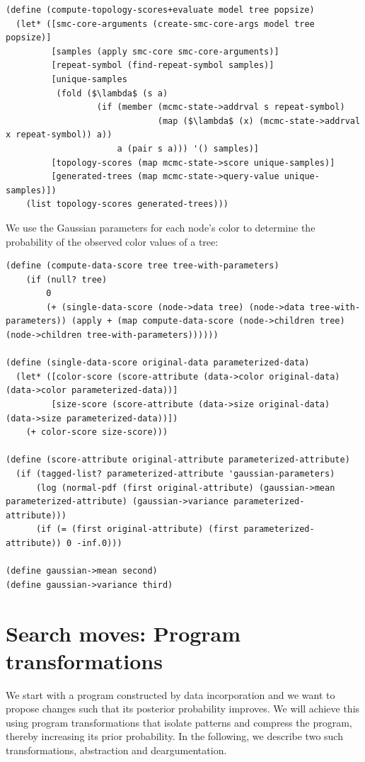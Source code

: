 \documentclass[a4paper,10pt]{article}
\begin{document}
\begin{lstlisting}[frame=trbl]
(define (compute-topology-scores+evaluate model tree popsize)
  (let* ([smc-core-arguments (create-smc-core-args model tree popsize)]
         [samples (apply smc-core smc-core-arguments)]
         [repeat-symbol (find-repeat-symbol samples)]
         [unique-samples
          (fold ($\lambda$ (s a)
                  (if (member (mcmc-state->addrval s repeat-symbol)
                              (map ($\lambda$ (x) (mcmc-state->addrval x repeat-symbol)) a))
                      a (pair s a))) '() samples)]
         [topology-scores (map mcmc-state->score unique-samples)]
         [generated-trees (map mcmc-state->query-value unique-samples)])
    (list topology-scores generated-trees)))
\end{lstlisting}
We use the Gaussian parameters for each node's color to determine the probability of the observed color values of a tree:
\begin{lstlisting}[frame=trbl]
(define (compute-data-score tree tree-with-parameters)
    (if (null? tree)
        0
        (+ (single-data-score (node->data tree) (node->data tree-with-parameters)) (apply + (map compute-data-score (node->children tree) (node->children tree-with-parameters))))))

(define (single-data-score original-data parameterized-data)
  (let* ([color-score (score-attribute (data->color original-data) (data->color parameterized-data))]
         [size-score (score-attribute (data->size original-data) (data->size parameterized-data))])
    (+ color-score size-score)))

(define (score-attribute original-attribute parameterized-attribute)
  (if (tagged-list? parameterized-attribute 'gaussian-parameters)
      (log (normal-pdf (first original-attribute) (gaussian->mean parameterized-attribute) (gaussian->variance parameterized-attribute)))
      (if (= (first original-attribute) (first parameterized-attribute)) 0 -inf.0)))

(define gaussian->mean second)
(define gaussian->variance third)
\end{lstlisting}


\newpage
\section{Search moves: Program transformations}

We start with a program constructed by data incorporation and we want to propose changes such that its posterior probability improves. We will achieve this  using program transformations that isolate patterns and compress the program, thereby increasing its prior probability. In the following, we describe two such transformations, abstraction and deargumentation.
\end{document}
